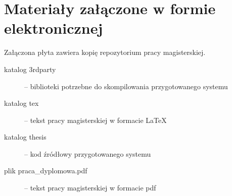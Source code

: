 \chapter{Materiały załączone w formie elektronicznej}

Załączona płyta zawiera kopię repozytorium pracy magisterskiej.

\begin{description}

\item[katalog 3rdparty] --
biblioteki potrzebne do skompilowania przygotowanego systemu

\item[katalog tex] --
tekst pracy magisterskiej w formacie \LaTeX

\item[katalog thesis] --
kod źródłowy przygotowanego systemu

\item[plik praca\_dyplomowa.pdf] --
tekst pracy magisterskiej w formacie pdf


\end{description}